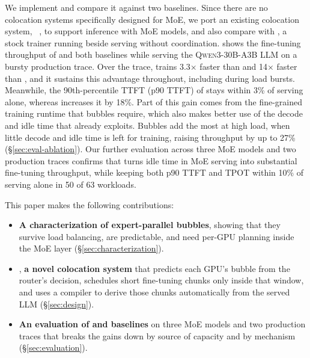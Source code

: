 We implement \sys and compare it against two baselines.
Since there are no colocation systems specifically designed for \ac{MoE}, we port an existing colocation system, \llmstation~\cite{llmstation}, to support inference with \ac{MoE} models, and also compare with \uncoord, a stock trainer running beside serving without coordination.
 shows the fine-tuning throughput of \sys and both baselines while serving the \textsc{Qwen3-30B-A3B} \ac{LLM} on a bursty production trace.
Over the trace, \sys trains 3.3$\times$ faster than \llmstation and 14$\times$ faster than \uncoord, and it sustains this advantage throughout,
including during load bursts.
Meanwhile, the 90th-percentile \acf{TTFT} (p90 \ac{TTFT}) of \sys stays within 3\% of serving alone, whereas \uncoord increases it by 18\%.
Part of this gain comes from the fine-grained training runtime that bubbles require, which also makes better use of the decode and idle time that \llmstation already exploits.
Bubbles add the most at high load, when little decode and idle time is left for training, raising throughput by up to 27\% (\S\ref{sec:eval-ablation}).
Our further evaluation across three \ac{MoE} models and two production traces confirms that \sys turns idle time in \ac{MoE} serving into substantial fine-tuning throughput, while keeping both p90 \ac{TTFT} and \ac{TPOT} within 10\% of serving alone in 50 of 63 workloads.

This paper makes the following contributions:
\begin{itemize}
  \item \textbf{A characterization of expert-parallel bubbles}, showing that they survive
    load balancing, are predictable, and need per-GPU planning inside the \ac{MoE} layer (\S\ref{sec:characterization}).
  \item \sys, \textbf{a novel colocation system} that predicts each GPU’s bubble from the router’s decision, schedules short fine-tuning chunks only inside that window, and uses a compiler to derive those chunks automatically from the served \ac{LLM} (\S\ref{sec:design}).

  \item \textbf{An evaluation of \sys and baselines} on three \ac{MoE} models and two production traces that breaks the gains down by source of capacity and by mechanism (\S\ref{sec:evaluation}).
\end{itemize}

